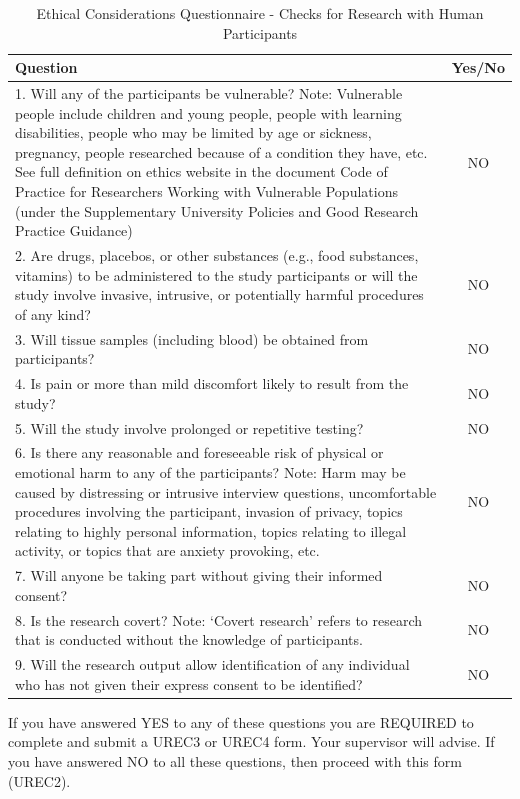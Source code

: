 \documentclass{article}
\begin{document}
\newpage

\begin{table}
\centering
\begin{tabular}{|p{10cm}|c|}
\hline
Question & Yes/No \\
\hline
1. Will any of the participants be vulnerable? Note: Vulnerable people include children and young people, people with learning disabilities, people who may be limited by age or sickness, pregnancy, people researched because of a condition they have, etc. See full definition on ethics website in the document Code of Practice for Researchers Working with Vulnerable Populations (under the Supplementary University Policies and Good Research Practice Guidance) & NO \\
2. Are drugs, placebos, or other substances (e.g., food substances, vitamins) to be administered to the study participants or will the study involve invasive, intrusive, or potentially harmful procedures of any kind? & NO \\
3. Will tissue samples (including blood) be obtained from participants? & NO \\
4. Is pain or more than mild discomfort likely to result from the study? & NO \\
5. Will the study involve prolonged or repetitive testing? & NO \\
6. Is there any reasonable and foreseeable risk of physical or emotional harm to any of the participants? Note: Harm may be caused by distressing or intrusive interview questions, uncomfortable procedures involving the participant, invasion of privacy, topics relating to highly personal information, topics relating to illegal activity, or topics that are anxiety provoking, etc. & NO \\
7. Will anyone be taking part without giving their informed consent? & NO \\
8. Is the research covert? Note: ‘Covert research’ refers to research that is conducted without the knowledge of participants. & NO \\
9. Will the research output allow identification of any individual who has not given their express consent to be identified? & NO \\
\hline
\end{tabular}
\caption{Ethical Considerations Questionnaire - Checks for Research with Human Participants}
\end{table}

If you have answered YES to any of these questions you are REQUIRED to complete and submit a UREC3 or UREC4 form. Your supervisor will advise. If you have answered NO to all these questions, then proceed with this form (UREC2).
\end{document}
